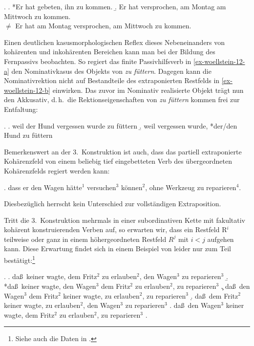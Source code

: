 \ex. \label{ex-3konstr-2}
\a. *Er hat gebeten, ihn zu kommen.
\b. Er hat versprochen, am Montag am Mittwoch zu kommen. \\
$\neq$ Er hat am Montag versprochen, am Mittwoch zu kommen.     

Einen deutlichen kasusmorphologischen Reflex dieses Nebeneinanders von kohärenten und inkohärenten Bereichen kann man bei der Bildung des Fernpassivs beobachten. So regiert das finite Passivhilfsverb in \ref{ex-woellstein-12-a} den Nominativkasus des Objekts von {\it zu füttern}. Dagegen kann die Nominativrektion nicht auf Bestandteile des extraponierten Restfelds in \ref{ex-woellstein-12-b} einwirken. Das zuvor im Nominativ realisierte Objekt trägt nun den Akkusativ, d.\,h.\ die Rektionseigenschaften von {\it zu füttern} kommen frei zur Entfaltung:      

\ex. 
\a. weil der Hund vergessen wurde zu füttern \hfill \citep[(12c)]{Woellstein:01}\label{ex-woellstein-12-a} 
\b. weil vergessen wurde, *der/den Hund zu füttern \label{ex-woellstein-12-b}
  
Bemerkenswert an der 3.~Konstruktion ist auch, dass das partiell extraponierte Kohärenzfeld von einem beliebig tief eingebetteten Verb des übergeordneten Kohärenzfelds regiert werden kann:

\ex. dass er den Wagen hätte$^1$ versuchen$^3$ können$^2$, ohne Werkzeug zu repa\-rie\-ren$^4$.

Diesbezüglich herrscht kein Unterschied zur vollständigen Extraposition.

Tritt die 3.~Konstruktion mehrmals in einer subordinativen Kette mit fakultativ kohärent konstruierenden Verben auf, so erwarten wir, dass ein Restfeld R$^i$ teilweise oder ganz in einem höhergeordneten Restfeld $R^j$ mit $i<j$ aufgehen kann. Diese Erwartung findet sich in einem Beispiel von \cite{Sabel:95} leider nur zum Teil bestätigt:\footnote{Siehe auch die Daten in \citet[18]{Rambow:94}.}

{\setlength{\Exlabelsep}{0.8em} \setlength{\SubExleftmargin}{1.7em}
\ex.
\a. da\ss\ keiner wagte, dem Fritz$^2$ zu erlauben$^2$, den Wagen$^3$ zu reparie\-ren$^3$
\b. *da\ss\ keiner wagte, den Wagen$^3$ dem Fritz$^2$ zu erlauben$^2$, zu reparie\-ren$^3$\label{ex-sabel-28-b}
\c. da\ss\ den Wagen$^3$ dem Fritz$^2$ keiner wagte, zu erlauben$^2$, zu reparie\-ren$^3$
\d. da\ss\ dem Fritz$^2$ keiner wagte, zu erlauben$^2$, den Wagen$^3$ zu reparie\-ren$^3$
\e. da\ss\ den Wagen$^3$ keiner wagte, dem Fritz$^2$ zu erlauben$^2$, zu reparie\-ren$^3$
\z. \citep[(28)]{Sabel:95}

}

